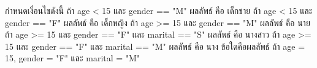 ﻿%
\question กำหนดเงื่อนไขดังนี้ \newline
ถ้า age < 15 และ gender == "M" \quad ผลลัพธ์ คือ เด็กชาย \newline
ถ้า age < 15 และ gender == "F" \quad ผลลัพธ์ คือ เด็กหญิง \newline
ถ้า age >= 15 และ gender == "M" \quad ผลลัพธ์ คือ นาย \newline
ถ้า age >= 15 และ gender == "F" และ marital == "S" \quad ผลลัพธ์ คือ นางสาว \newline
ถ้า age >= 15 และ gender == "F" และ marital == "M" \quad ผลลัพธ์ คือ นาง \newline
ข้อใดคือผลลัพธ์ ถ้า age = 15, gender = "F" และ marital = "M"
\newline
{}
